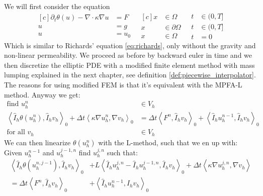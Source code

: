 \documentclass[../Main/main.tex]{subfiles}
\begin{document}
	
	We will first consider the equation
	\begin{equation}\label{eq:richards simple}
		\begin{aligned}[c]
			\partial_t \theta(u) - \nabla \cdot \kappa \nabla u &= F \\
			u &= g \\
			u &= u_0
		\end{aligned}
		\ \ \
		\begin{aligned}[c]
			x &\in \Omega  \\
			x &\in \partial \Omega \\
			x &\in \Omega  
		\end{aligned}
		\ \ \
		\begin{aligned}
			t&\in (0,T] \\
			t&\in (0,T] \\
			t&=0
		\end{aligned}
	\end{equation}
	Which is similar to Richards' equation \eqref{eq:richards}, only without the gravity and non-linear permeability. We proceed as before by backward euler in time and we then discretize the elliptic PDE with a modified finite element method with mass lumping explained in the next chapter, see definition \ref{def:piecewise_interpolator}. The reasons for using modified FEM is that it's equivalent with the MPFA-L method. Anyway we get:
	\begin{equation}\label{eq:richards_timedisc}
		\begin{aligned}
			\text{find }u_h^n&\in V_h\\
			\left \langle \hat{I}_h \theta(u_h^n),\hat{I}_h v_h \right \rangle_0 +\Delta t \left \langle \kappa \nabla u^n_h, \nabla v_h \right \rangle_0 &= \Delta t \left \langle F^n,\hat{I}_h v_h \right \rangle_0 + \left \langle \hat{I}_h u_h^{n-1},\hat{I}_h v_h \right \rangle_0 \\
			\text{for all }v_h &\in V_h
		\end{aligned}
	\end{equation}
	We can then linearize $\theta(u^n_h)$ with the L-method, such that we en up with: Given $u^{n-1}_h$ and $u^{j-1,n}_h$ find $u^{j,n}_h$ such that:
	\begin{equation}\label{eq:L-scheme-FEM}
		\begin{aligned}
			\left \langle \hat{I}_h \theta(u^{n,j-1}_h),\hat{I}_h v_h \right \rangle_0 &+ L \left \langle \hat{I}_h u^{j,n}_h -  \hat{I}_h u^{j-1,n}_h,\hat{I}_h v_h \right \rangle_0 + \Delta t \left \langle \kappa \nabla u^{j,n}_h,\nabla v_h \right \rangle \\=\Delta t \left \langle F^n,\hat{I}_h v_h \right \rangle_0 &+ \left \langle \hat{I}_h u_h^{n-1},\hat{I}_h v_h \right \rangle_0 
		\end{aligned}
	\end{equation}
\end{document}
